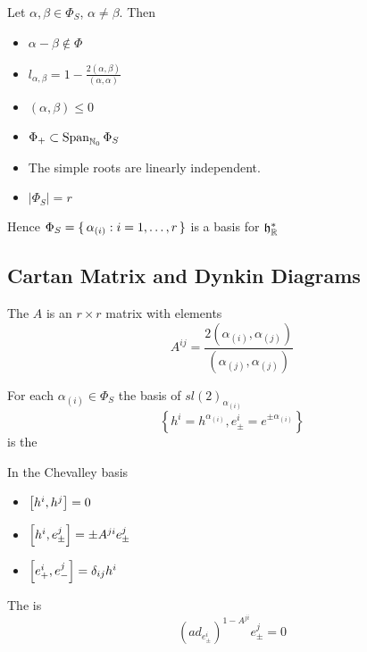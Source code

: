 \documentclass{article}
\begin{document}
\begin{theorem}
Let $\alpha,\beta\in\Phi_S$, $\alpha\neq\beta$. Then
\begin{itemize}
    \item $\alpha-\beta\notin\Phi$
    \item $l_{\alpha,\beta}=1-\frac{2(\alpha,\beta)}{(\alpha,\alpha)}$
    \item $(\alpha,\beta)\leq0$
    \item $\Phi_+\subset\spn_{\mbb{N}_0}\Phi_S$
    \item The simple roots are linearly independent.
    \item $|\Phi_S|=r$
\end{itemize}
Hence $\Phi_S=\set{  \alpha_{(i)} : i=1,\dots,r  }$ is a basis for $\mf{h}^\ast_\mbb{R}$
\end{theorem}

\subsection{Cartan Matrix and Dynkin Diagrams}

\begin{definition}
The  $A$ is an $r \times r$ matrix with elements 
\[
A^{ij}=\frac{2(\alpha_{(i)},\alpha_{(j)})}{(\alpha_{(j)},\alpha_{(j)})}
\]
\end{definition}

\begin{definition}
For each $\alpha_{(i)}\in\Phi_S$ the basis of $sl(2)_{\alpha_{(i)}}$
\[
\left\{ h^i=h^{\alpha_{(i)}}, e^i_\pm=e^{\pm\alpha_{(i)}} \right\}
\]
is the 
\end{definition}

\begin{theorem}
In the Chevalley basis
\begin{itemize}
    \item $\comm[h^i]{h^j}=0$
    \item $\comm[h^i]{e^j_\pm}=\pm A^{ji} e^j_\pm$
    \item $\comm[e^i_+]{e^j_-}=\delta_{ij} h^i$
\end{itemize}
\end{theorem}

\begin{theorem}
The  is 
\[
\left( ad_{e^i_\pm}\right)^{1-A^{ji}} e^j_\pm=0
\]
\end{theorem}
\end{document}
